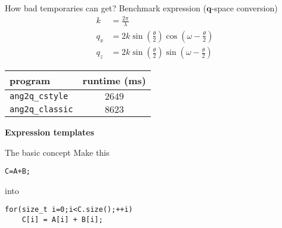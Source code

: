 \documentclass{beamer}
\begin{document}
\begin{frame}[fragile]{How bad temporaries can get?}
    Benchmark expression ($\mathbf{q}$-space conversion)
    \begin{align}
    k &= \frac{2\pi}{\lambda} \nonumber \\
        q_x &= 2k\sin\left(\frac{\theta}{2}\right)\cos\left(\omega-\frac{\theta}{2}\right)
        \nonumber \\
        q_z &= 2k\sin\left(\frac{\theta}{2}\right)\sin\left(\omega-\frac{\theta}{2}\right)
        \nonumber
    \end{align}

    \vspace{0.05\textheight}
    \begin{center}
        \begin{tabular}{lc}
            \hline
            program & runtime (ms) \\
            \hline\hline
            \texttt{ang2q\_cstyle} & $2649$ \\
            \texttt{ang2q\_classic} & $8623$  \\
            \hline
        \end{tabular}
    \end{center}

\end{frame}

\begin{frame}[plain]
    \begin{center}
        \huge\textbf{Expression templates}
    \end{center}
\end{frame}

\begin{frame}[fragile]{The basic concept}
    Make this
    \vspace{0.05\textheight}
    \begin{verbatim}
C=A+B;
    \end{verbatim}
    \vspace{0.05\textheight}
    into
    \vspace{0.05\textheight}
    \begin{verbatim}
for(size_t i=0;i<C.size();++i)
    C[i] = A[i] + B[i];
    \end{verbatim}
\end{frame}
\end{document}
